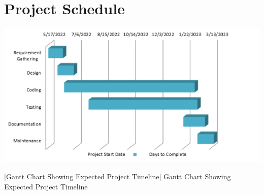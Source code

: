 
\section{Project Schedule}
\vspace{10pt}


\includegraphics[width=1 \linewidth]{images/appendix/Gantt.png}



[Gantt Chart Showing Expected Project Timeline]{
Gantt Chart Showing Expected Project Timeline
}

 \newpage


